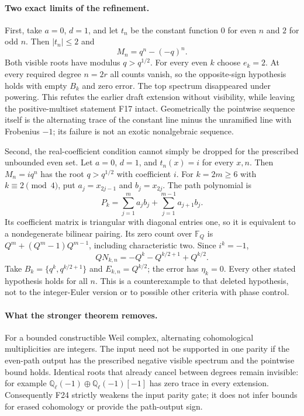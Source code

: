 \documentclass[11pt,a4paper]{article}
\newcommand{\Q}{\mathbb Q}\newcommand{\Z}{\mathbb Z}\newcommand{\C}{\mathbb C}\newcommand{\N}{\mathbb N}\newcommand{\F}{\mathbb F}
\newcommand{\fid}[1]{\textsf{#1}}\newcommand{\gate}[1]{\textsf{#1}}
\theoremstyle{named}\newtheorem{finding}{Finding}[section]
\theoremstyle{definition}\newtheorem{definition}[finding]{Definition}
\theoremstyle{remark}\newtheorem{remark}[finding]{Remark}
\begin{document}
\paragraph{Two exact limits of the refinement.}
First, take $a=0$, $d=1$, and let $t_n$ be the constant function $0$ for even
$n$ and $2$ for odd $n$. Then $|t_n|\le2$ and
\[
 M_n=q^n-(-q)^n.
\]
Both visible roots have modulus $q>q^{1/2}$. For every even $k$ choose
$e_k=2$. At every required degree $n=2r$ all counts vanish, so the
opposite-sign hypothesis holds with empty $B_k$ and zero error. The top
spectrum disappeared under powering. This refutes the earlier draft
extension without visibility, while leaving the positive-multiset
statement \fid{F17} intact. Geometrically the pointwise sequence itself
is the alternating trace of the constant line minus the unramified line
with Frobenius $-1$; its failure is not an exotic nonalgebraic sequence.

Second, the real-coefficient condition cannot simply be dropped for the
prescribed unbounded even set. Let $a=0$, $d=1$, and $t_n(x)=i$ for every
$x,n$. Then $M_n=iq^n$ has the root $q>q^{1/2}$ with coefficient $i$.
For $k=2m\ge6$ with $k\equiv2\pmod4$, put $a_j=x_{2j-1}$ and $b_j=x_{2j}$. The path
polynomial is
\[
 P_k=\sum_{j=1}^{m}a_jb_j+
       \sum_{j=1}^{m-1}a_{j+1}b_j.
\]
Its coefficient matrix is triangular with diagonal entries one, so it is
equivalent to a nondegenerate bilinear pairing. Its zero count over
$\F_Q$ is $Q^m+(Q^m-1)Q^{m-1}$, including characteristic two.
Since $i^k=-1$,
\[
 QN_{k,n}=-Q^k-Q^{k/2+1}+Q^{k/2}.
\]
Take $B_k=\{q^k,q^{k/2+1}\}$ and $E_{k,n}=Q^{k/2}$; the error has
$\eta_k=0$. Every other stated hypothesis holds for all $n$. This is a
counterexample to that deleted hypothesis, not to the integer-Euler
version or to possible other criteria with phase control.

\paragraph{What the stronger theorem removes.}
For a bounded constructible Weil complex, alternating cohomological
multiplicities are integers. The input need not be supported in one parity
if the even-path output has the prescribed negative visible spectrum and
the pointwise bound holds. Identical roots that already cancel between
degrees remain invisible: for example
$\Q_\ell(-1)\oplus\Q_\ell(-1)[-1]$ has zero trace in every extension.
Consequently \fid{F24} strictly weakens the input parity gate; it does not
infer bounds for erased cohomology or provide the path-output sign.
\end{document}
